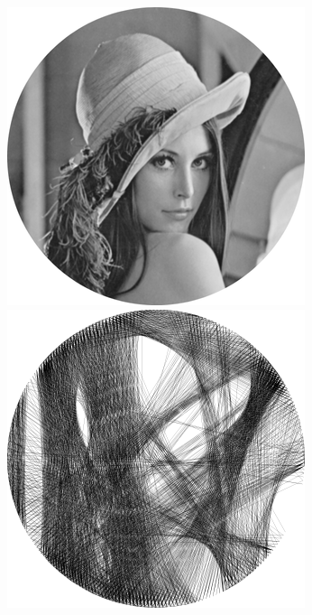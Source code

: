 \begin{figure}[H]
    \centering
    \begin{minipage}{0.2\linewidth}
        \centering
        \includegraphics[width=\linewidth]{images/radon/lena_bw.png}
    \end{minipage}
    \begin{minipage}{0.2\linewidth}
        \centering
        \includegraphics[width=\linewidth]{images/radon/lena_radon.png}

\end{minipage}
\end{figure}
